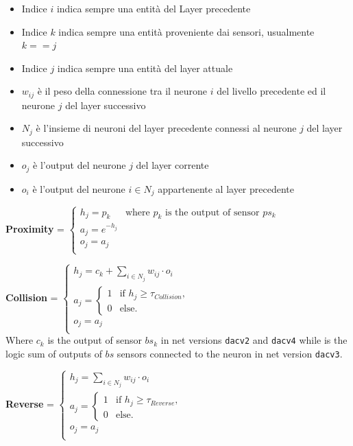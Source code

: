 \begin{itemize}
    \item Indice ${i}$ indica sempre una entità del Layer precedente
    \item Indice ${k}$ indica sempre una entità proveniente dai sensori, usualmente $k==j$
    \item Indice ${j}$ indica sempre una entità del layer attuale
    \item $w_{ij}$ è il peso della connessione tra il neurone $i$ del livello precedente ed il neurone $j$ del layer successivo
    \item $N_j$ è l'insieme di neuroni del layer precedente connessi al neurone $j$ del layer successivo
    \item $o_j$ è l'output del neurone $j$ del layer corrente
    \item $o_i$ è l'output del neurone $i \in N_j$ appartenente al layer precedente
\end{itemize}

\newpage

\textbf{Proximity} = $
    \begin{cases}
        h_j=p_k & \text{where $p_k$ is the output of sensor $ps_k$} \\
        a_j=e^{-h_j} & \\
        o_j=a_j & \\
    \end{cases}
$\\

\hfill\break

\textbf{Collision} = $
    \begin{cases}
        h_j = c_k + \sum_{i\in N_j} w_{ij}\cdot o_i \\
        a_j = \begin{cases}
           1 & \text{if $h_j \ge \tau_{Collision}$,}\\
           0 & \text{else.}
        \end{cases} & \\
        o_j = a_j & \\
    \end{cases}
$\\

\hfill\break
Where $c_k$ is the output of sensor $bs_k$ in net versions \texttt{dacv2} and \texttt{dacv4} while is the logic sum of outputs of $bs$ sensors connected to the neuron in net version \texttt{dacv3}. 

\hfill\break

\textbf{Reverse} = $
    \begin{cases}
        h_j = \sum_{i\in N_j} w_{ij}\cdot o_i & \\
        a_j = \begin{cases}
           1 & \text{if $h_j \ge \tau_{Reverse}$,}\\
           0 & \text{else.}
        \end{cases} & \\
        o_j = a_j & \\
    \end{cases}
$\\

